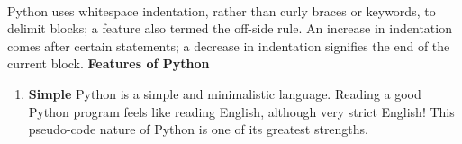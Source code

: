 \paragraph{} Python uses whitespace indentation, rather than curly braces or keywords, to delimit blocks; a feature also termed the off-side rule. An increase in indentation comes after certain statements; a decrease in indentation signifies the end of the current block.
\textbf{Features of Python}
\begin{enumerate}[1. ]
\item \textbf {Simple} \newline Python is a simple and minimalistic language. Reading a good Python program feels like reading English, although very strict English! This pseudo-code nature of Python is one of its greatest strengths.


\end{enumerate}

